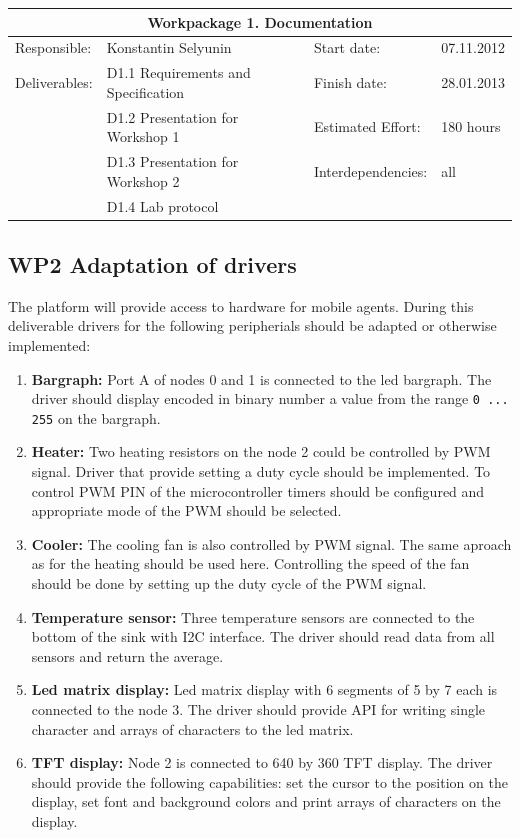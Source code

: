 \documentclass{scrreprt}
\begin{document}
\vspace{0.2in}
\begin{tabular}{|ll|ll|}
\hline \multicolumn{4}{|c|}{\textbf{Workpackage 1. Documentation}}\\
\hline
Responsible:	&  Konstantin Selyunin			& Start date:		& 07.11.2012 \\
Deliverables:	&  D1.1 Requirements and Specification  & Finish date:	 	& 28.01.2013\\
		&  D1.2 Presentation for Workshop 1	& Estimated Effort: 	& 180 hours \\
		&  D1.3 Presentation for Workshop 2	& Interdependencies:	& all	\\
		&  D1.4 Lab protocol			& 			& 	\\
\hline
\end{tabular}

	\subsection{WP2 Adaptation of drivers}

The platform will provide access to hardware for mobile agents.
During this deliverable drivers for the following peripherials should be adapted or otherwise implemented:
\begin{enumerate}

\item{\textbf{Bargraph:} Port A of nodes 0 and 1 is connected to the led bargraph.
The driver should display encoded in binary number a value from the range \texttt{0 ... 255} on the bargraph.
}


\item{\textbf{Heater:} Two heating resistors on the node 2 could be controlled by PWM signal.
Driver that provide setting a duty cycle should be implemented.
To control PWM PIN of the microcontroller timers should be configured and appropriate mode of the PWM should be selected.
}

\item{\textbf{Cooler:} The cooling fan is also controlled by PWM signal.
The same aproach as for the heating should be used here.
Controlling the speed of the fan should be done by setting up the duty cycle of the PWM signal.
}

\item{\textbf{Temperature sensor:} 
Three temperature sensors are connected to the bottom of the sink with I2C interface.
The driver should read data from all sensors and return the average.
}

\item{\textbf{Led matrix display:} 
Led matrix display with 6 segments of 5 by 7 each is connected to the node 3.
The driver should provide API for writing single character and arrays of characters to the led matrix.
}

\item{\textbf{TFT display:} 
Node 2 is connected to 640 by 360 TFT display.
The driver should provide the following capabilities: 
set the cursor to the position on the display,
set font and background colors and print arrays of characters on the display.
}
\end{enumerate}
\end{document}
